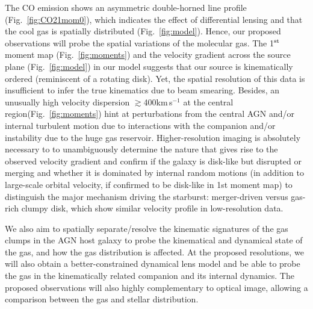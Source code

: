 \documentclass[12pt,a4paper]{article}  %
\newcommand{\kms}{km\,s$^{-1}$\xspace}
\newcommand{\Fig}[1]{Fig.~\ref{fig:#1}}
\begin{document}
The CO emission shows an asymmetric double-horned line profile (\Fig{CO21mom0}), which 
indicates the effect of differential lensing and that the cool gas is spatially distributed (\Fig{model}). 
Hence, our proposed observations will probe the spatial variations of the molecular gas. 
The 1$^{\rm st}$ moment map (\Fig{moments}) and the velocity gradient 
across the source plane (Fig.~\ref{fig:model}) in our model suggests
that our source is kinematically ordered (reminiscent of a rotating disk). Yet,  
the spatial resolution of this data is insufficient to infer the true 
kinematics due to beam smearing. Besides, 
an unusually high velocity dispersion 
$\gtrsim$400\kms at the central region(\Fig{moments})  hint at 
perturbations from the central AGN and/or
internal turbulent motion due to interactions with the companion
and/or instability due to the huge gas reservoir.
Higher-resolution imaging is absolutely necessary to 
to unambiguously determine the nature that gives rise to 
the observed velocity gradient and 
confirm if the galaxy is disk-like but disrupted or merging
and whether it is dominated by internal random 
motions (in addition to large-scale orbital velocity, if confirmed to be disk-like in 1st moment map)
to distinguish the major mechanism driving the starburst: merger-driven 
versus gas-rich clumpy disk, which show similar velocity profile in low-resolution data. 

We also aim to spatially separate/resolve the kinematic 
signatures of the gas clumps in the AGN host galaxy to probe
the kinematical and dynamical state of the gas, and 
how the gas distribution is affected. 
At the proposed resolutions, we will also
obtain a better-constrained dynamical lens model
and be able to probe the gas in the kinematically related companion 
and its internal dynamics. 
The proposed observations will also highly complementary to optical image,
allowing a comparison between the gas and stellar distribution.
\end{document}
